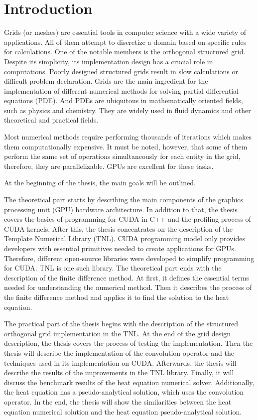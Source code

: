 
\chapter*{Introduction}

Grids (or meshes) are essential tools in computer science with a wide variety of applications.
All of them attempt to discretize a domain based on specific rules for calculations.
One of the notable members is the orthogonal structured grid.
Despite its simplicity, its implementation design has a crucial role in computations.
Poorly designed structured grids result in slow calculations or difficult problem declaration.
Grids are the main ingredient for the implementation of different numerical methods for solving partial differential equations (PDE).
And PDEs are ubiquitous in mathematically oriented fields, such as physics and chemistry.
They are widely used in fluid dynamics and other theoretical and practical fields.

Most numerical methods require performing thousands of iterations which makes them computationally expensive.
It must be noted, however, that some of them perform the same set of operations simultaneously for each entity in the grid, therefore, they are parallelizable.
GPUs are excellent for these tasks.

At the beginning of the thesis, the main goals will be outlined.

The theoretical part starts by describing the main components of the graphics processing unit (GPU) hardware architecture.
In addition to that, the thesis covers the basics of programming for CUDA in C++ and the profiling process of CUDA kernels.
After this, the thesis concentrates on the description of the Template Numerical Library (TNL).
CUDA programming model only provides developers with essential primitives needed to create applications for GPUs.
Therefore, different open-source libraries were developed to simplify programming for CUDA.
TNL is one such library.
The theoretical part ends with the description of the finite difference method.
At first, it defines the essential terms needed for understanding the numerical method.
Then it describes the process of the finite difference method and applies it to find the solution to the heat equation.

The practical part of the thesis begins with the description of the structured orthogonal grid implementation in the TNL.
At the end of the grid design description, the thesis covers the process of testing the implementation.
Then the thesis will describe the implementation of the convolution operator and the techniques used in its implementation on CUDA.
Afterwards, the thesis will describe the results of the improvements in the TNL library.
Finally, it will discuss the benchmark results of the heat equation numerical solver.
Additionally, the heat equation has a pseudo-analytical solution, which uses the convolution operator.
In the end, the thesis will show the similarities between the heat equation numerical solution and the heat equation pseudo-analytical solution.

